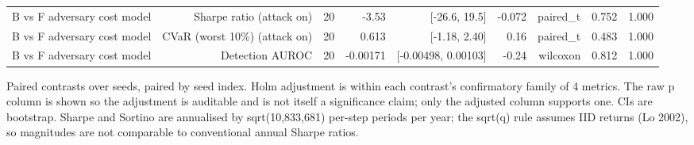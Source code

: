 \begin{table}[htbp]
\begin{tabular}{lrrrrrrrr}
    B vs F   adversary cost model & Sharpe ratio (attack on) & 20 & -3.53 & [-26.6, 19.5] & -0.072 & paired\_t & 0.752 & 1.000 \\
    B vs F   adversary cost model & CVaR (worst 10\%) (attack on) & 20 & 0.613 & [-1.18, 2.40] & 0.16 & paired\_t & 0.483 & 1.000 \\
    B vs F   adversary cost model & Detection AUROC & 20 & -0.00171 & [-0.00498, 0.00103] & -0.24 & wilcoxon & 0.812 & 1.000 \\
    \bottomrule
  \end{tabular}
  \begin{minipage}{\linewidth}\vspace{4pt}\footnotesize Paired contrasts over seeds, paired by seed index. Holm adjustment is within each contrast's confirmatory family of 4 metrics. The raw p column is shown so the adjustment is auditable and is not itself a significance claim; only the adjusted column supports one. CIs are bootstrap. Sharpe and Sortino are annualised by sqrt(10,833,681) per-step periods per year; the sqrt(q) rule assumes IID returns (Lo 2002), so magnitudes are not comparable to conventional annual Sharpe ratios.\end{minipage}
\end{table}
